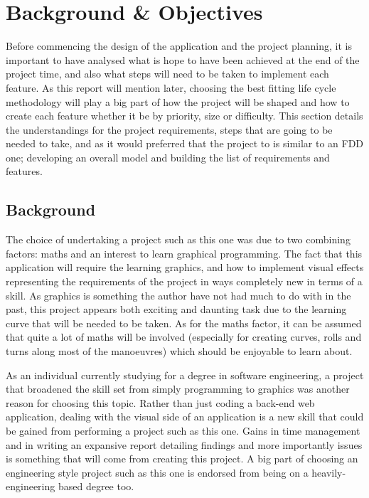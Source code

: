\chapter{Background \& Objectives}
Before commencing the design of the application and the project planning, it is important to have analysed what is hope to have been achieved at the end of the project time, and also what steps will need to be taken to implement each feature. As this report will mention later, choosing the best fitting life cycle methodology will play a big part of how the project will be shaped and how to create each feature whether it be by priority, size or difficulty. This section details the understandings for the project requirements, steps that are going to be needed to take, and as it would preferred that the project to is similar to an FDD one; developing an overall model and building the list of requirements and features.

\section{Background}
The choice of undertaking a project such as this one was due to two combining factors: maths and an interest to learn graphical programming. The fact that this application will require the learning graphics, and how to implement visual effects representing the requirements of the project in ways completely new in terms of a skill. As graphics is something the author have not had much to do with in the past, this project appears both exciting and daunting task due to the learning curve that will be needed to be taken. As for the maths factor, it can be assumed that quite a lot of maths will be involved (especially for creating curves, rolls and turns along most of the manoeuvres) which should be enjoyable to learn about.

As an individual currently studying for a degree in software engineering, a project that broadened the skill set from simply programming to graphics was another reason for choosing this topic. Rather than just coding a back-end web application, dealing with the visual side of an application is a new skill that could be gained from performing a project such as this one. Gains in time management and in writing an expansive report detailing findings and more importantly issues is something that will come from creating this project. A big part of choosing an engineering style project such as this one is endorsed from being on a heavily-engineering based degree too.


